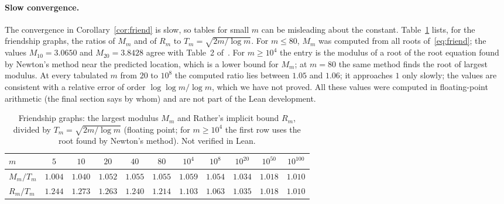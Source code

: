 \documentclass[11pt]{article}
\theoremstyle{definition}
\theoremstyle{remark}
\begin{document}
\paragraph{Slow convergence.}
The convergence in Corollary~\ref{cor:friend} is slow, so tables for small
$m$ can be misleading about the constant. Table~\ref{tab:num} lists, for the
friendship graphs, the ratios of $M_m$ and of $R_m$ to $T_m=\sqrt{2m/\log m}$.
For $m\le80$, $M_m$ was computed from all roots of~\eqref{eq:friend}; the
values $M_{10}=3.0650$ and $M_{20}=3.8428$ agree with Table~2 of~\cite{ra}.
For $m\ge10^4$ the entry is the modulus of a root of the root equation found
by Newton's method near the predicted location, which is a lower bound for
$M_m$; at $m=80$ the same method finds the root of largest modulus. At
every tabulated $m$ from $20$ to $10^8$ the computed ratio lies between $1.05$
and $1.06$; it approaches $1$ only slowly; the values are consistent with a relative error of order
$\log\log m/\log m$, which we have not proved. All these values were
computed in floating-point arithmetic (the final section says by whom) and
are not part of the Lean development.

\begin{table}[ht]
\centering\small
\begin{tabular}{@{}lcccccccccc@{}}
\hline
$m$ & $5$ & $10$ & $20$ & $40$ & $80$ & $10^4$ & $10^8$ & $10^{20}$ &
$10^{50}$ & $10^{100}$\\
\hline
$M_m/T_m$ & $1.004$ & $1.040$ & $1.052$ & $1.055$ & $1.055$ & $1.059$ &
$1.054$ & $1.034$ & $1.018$ & $1.010$\\
$R_m/T_m$ & $1.244$ & $1.273$ & $1.263$ & $1.240$ & $1.214$ & $1.103$ &
$1.063$ & $1.035$ & $1.018$ & $1.010$\\
\hline
\end{tabular}
\caption{Friendship graphs: the largest modulus $M_m$ and Rather's implicit
bound $R_m$, divided by $T_m=\sqrt{2m/\log m}$ (floating point; for
$m\ge10^4$ the first row uses the root found by Newton's method). Not
verified in Lean.}
\label{tab:num}
\end{table}
\end{document}
